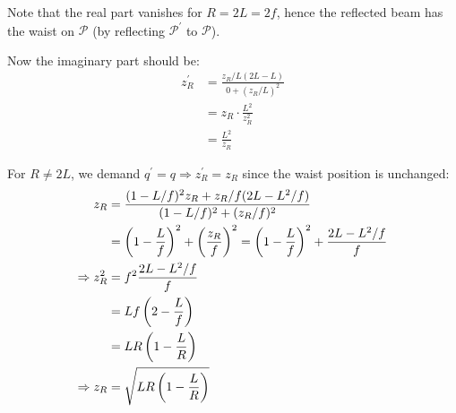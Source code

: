\begin{parts}
	Note that the real part vanishes for $R = 2L = 2f$, hence the reflected beam has the waist on $\mathcal{P}$ (by reflecting $\mathcal{P}^\prime$ to $\mathcal{P}$).
	
	Now the imaginary part should be:
	\begin{align*}
		z_R^\prime &= \frac{z_R/L (2L-L)}{0 + (z_R/L)^2} \\
		&= z_R \cdot \frac{L^2}{z_R^2} \\
		&= \frac{L^2}{z_R}
	\end{align*}
	
	For $R \neq 2L$, we demand $q^\prime = q \Rightarrow z_R^\prime = z_R$ since the waist position is unchanged:
	\begin{align*}
		z_R &= \frac{(1-L/f)^2 z_R + z_R/f (2L-L^2/f)}{(1-L/f)^2 + (z_R/f)^2} \\
		&= \left(1-\frac{L}{f}\right)^2 + \left(\frac{z_R}{f}\right)^2 = \left(1-\frac{L}{f}\right)^2 + \frac{2L-L^2/f}{f} \\
		\Rightarrow z_R^2 &= f^2 \frac{2L-L^2/f}{f} \\
		&= Lf \left(2 - \frac{L}{f}\right) \\
		&= LR \left(1 - \frac{L}{R}\right) \\
		\Rightarrow z_R &= \sqrt{LR\left(1-\frac{L}{R}\right)}
	\end{align*}
	

\end{parts}
